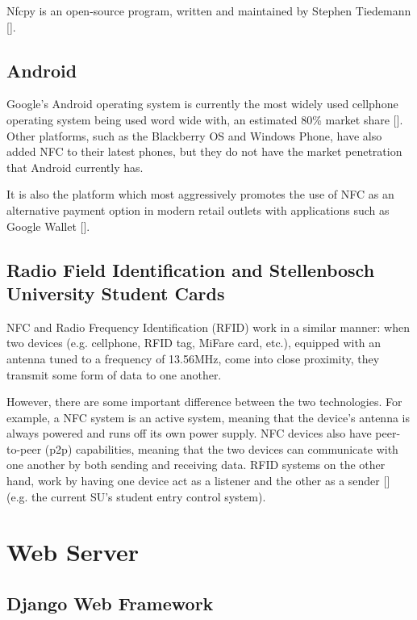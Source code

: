 Nfcpy is an open-source program, written and maintained by Stephen Tiedemann
[\cite{website:nfcpy}].

\subsection{Android}

Google's Android operating system is currently the most widely used cellphone operating system
being used word wide with, an estimated 80\% market share [\cite{website:android-marketshare}].
Other platforms, such as the Blackberry OS and Windows Phone, have also added NFC to their
latest phones, but they do not have the market penetration that Android currently has. 

It is also the platform which most aggressively promotes the use of NFC as an alternative 
payment option in modern retail outlets with applications such as Google Wallet
[\cite{website:android-wallet}].

\subsection{Radio Field Identification and Stellenbosch
University Student Cards}

NFC and Radio Frequency Identification (RFID) work in a similar manner: when two
devices  (e.g. cellphone, RFID tag, MiFare card, etc.), equipped with an antenna tuned to a
frequency  of 13.56MHz, come into close proximity, they transmit some form of data to one another.

However, there are some important difference between the two technologies. For example, a NFC
system is  an active system, meaning that the device's antenna is always powered and runs off
its own  power supply. NFC devices also have peer-to-peer (p2p) capabilities, meaning that the
two  devices can communicate with one another by both sending and receiving data.
RFID systems on the  other hand, work by having one device act as a listener and the other as a
sender [\cite{website:diff-nfc-rfid}] (e.g. the current SU's student entry control system).

\section{Web Server}

\subsection{Django Web Framework}

